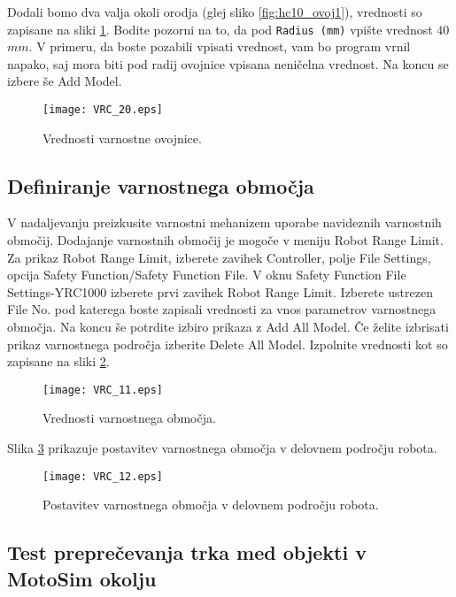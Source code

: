 Dodali bomo dva valja okoli orodja (glej sliko \ref{fig:hc10_ovoj1}), vrednosti so zapisane na sliki \ref{fig:VRC_10}. Bodite pozorni na to, da pod \verb|Radius (mm)| vpište vrednost $40$ $mm$. V primeru, da boste pozabili vpisati vrednost, vam bo program vrnil napako, saj mora biti pod radij ovojnice vpisana neničelna vrednost. Na koncu se izbere še Add Model.

\begin{figure}[hbt]
	\centering
	\texttt{[image: VRC\_20.eps]}
	\caption{Vrednosti varnostne ovojnice.}
	\label{fig:VRC_10}
\end{figure}

\subsection*{Definiranje varnostnega območja}

V nadaljevanju preizkusite varnostni mehanizem uporabe navideznih varnostnih območij. Dodajanje varnostnih območij je mogoče v meniju Robot Range Limit. Za prikaz Robot Range Limit, izberete zavihek Controller, polje File Settings, opcija Safety Function/Safety Function File. V oknu Safety Function File Settings-YRC1000 izberete prvi zavihek Robot Range Limit. Izberete ustrezen File No. pod katerega boste zapisali vrednosti za vnos parametrov varnostnega območja. Na koncu še potrdite izbiro prikaza z Add All Model. Če želite izbrisati prikaz varnostnega področja izberite Delete All Model. Izpolnite vrednosti kot so zapisane na sliki \ref{fig:VRC_11}.

\begin{figure}[hbt]
	\centering
	\texttt{[image: VRC\_11.eps]}
	\caption{Vrednosti varnostnega območja.}
	\label{fig:VRC_11}
\end{figure}

Slika \ref{fig:VRC_12} prikazuje postavitev varnostnega območja v delovnem področju robota.

\begin{figure}[hbt]
	\centering
	\texttt{[image: VRC\_12.eps]}
	\caption{Postavitev varnostnega območja v delovnem področju robota.}
	\label{fig:VRC_12}
\end{figure}


\subsection*{Test preprečevanja trka med objekti v MotoSim okolju}

